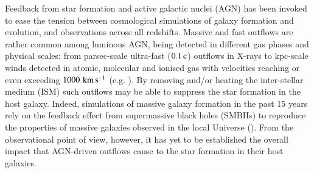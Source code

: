 \documentclass[longauth]{aa}
\newcommand{\kms}{\,\hbox{\hbox{km}\,\hbox{s}$^{-1}$}}
\begin{document}
Feedback from star formation and active galactic nuclei (AGN) has been invoked to ease the tension between cosmological simulations of galaxy formation and evolution, and observations across all redshifts. Massive and fast outflows are rather common among luminous AGN, being detected in different gas phases and physical scales: from parsec-scale ultra-fast ($0.1\, \rm{c}$) outflows in X-rays to kpc-scale winds detected in atomic, molecular and ionised gas with velocities reaching or even exceeding $1000\, \rm{\kms}$ (e.g. ). By removing and/or heating the inter-stellar medium (ISM) such outflows may be able to suppress the star formation in the host galaxy. Indeed, simulations of massive galaxy formation in the past 15 years rely on the feedback effect from supermassive black holes (SMBHs) to reproduce the properties of massive galaxies observed in the local Universe (). From the observational point of view, however, it has yet to be established the overall impact that AGN-driven outflows cause to the star formation in their host galaxies.
\end{document}
